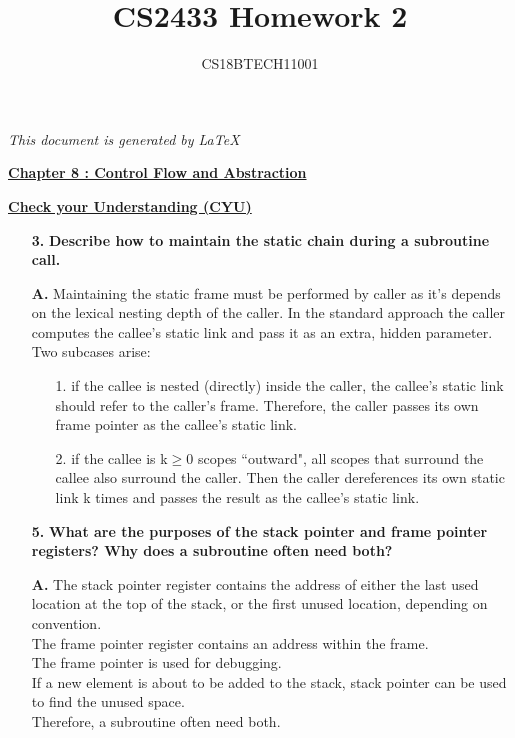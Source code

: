 \documentclass[letterpaper]{article}
\title{CS2433 Homework 2}
\author{CS18BTECH11001}
\begin{document}
\begin{large}
\maketitle
\begin{center}
\textit{This document is generated by \LaTeX}
\end{center}
\begin{flushleft}

\begin{center}
\underline{\textbf{Chapter 8 : Control Flow and Abstraction}}\\[0.2in] 
\end{center}
\textbf{\underline{Check your Understanding (CYU) }}\\[0.2in]
\begin{enumerate}

\item[\textbf{3.}]
\textbf{Describe how to maintain the static chain during a subroutine call.}
\item[\textbf{A.}]
Maintaining the static frame must be performed by caller as it's depends on the lexical nesting depth of the caller. In the standard approach the caller computes the callee’s static link and pass it as an extra, hidden parameter.
Two subcases arise:
\begin{enumerate}
\item[1.]
if the callee is nested (directly) inside the caller, the callee’s static link should refer to the caller’s frame. Therefore, the caller passes its own frame pointer as the callee’s static link.
\item[2.]
if the callee is k$\geq$0 scopes “outward", all scopes that surround the callee also surround the caller. Then the caller dereferences its own static link k times and passes the result as the callee’s static link.
\end{enumerate}

\item[\textbf{5.}]
\textbf{What are the purposes of the stack pointer and frame pointer registers? Why does a subroutine often need both?}
\item[\textbf{A.}]
The stack pointer register contains the address of either the last used location at the top of the stack, or the first unused location, depending on convention.\\
The frame pointer register contains an address within the frame.\\
The frame pointer is used for debugging.\\
If a new element is about to be added to the stack, stack pointer can be used to find the unused space.\\
Therefore, a subroutine often need both.


\end{enumerate}
\end{flushleft}
\end{large}
\end{document}
